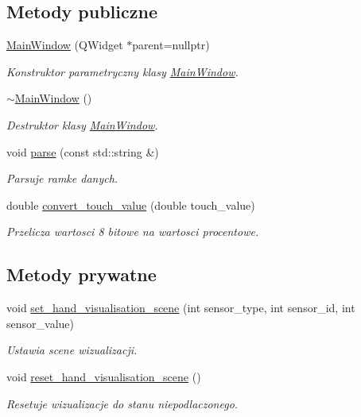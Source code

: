 \subsection*{Metody publiczne}
\begin{DoxyCompactItemize}
\item 
\hyperlink{class_main_window_a996c5a2b6f77944776856f08ec30858d}{Main\+Window} (Q\+Widget $\ast$parent=nullptr)
\begin{DoxyCompactList}\small\item\em Konstruktor parametryczny klasy \hyperlink{class_main_window}{Main\+Window}. \end{DoxyCompactList}\item 
\hyperlink{class_main_window_ae98d00a93bc118200eeef9f9bba1dba7}{$\sim$\+Main\+Window} ()
\begin{DoxyCompactList}\small\item\em Destruktor klasy \hyperlink{class_main_window}{Main\+Window}. \end{DoxyCompactList}\item 
void \hyperlink{class_main_window_abd0de3498ec3287461bbe2ce70791ede}{parse} (const std\+::string \&)
\begin{DoxyCompactList}\small\item\em Parsuje ramke danych. \end{DoxyCompactList}\item 
double \hyperlink{class_main_window_ac16a3b21d65b063b89b87e772afcfd0c}{convert\+\_\+touch\+\_\+value} (double touch\+\_\+value)
\begin{DoxyCompactList}\small\item\em Przelicza wartosci 8 bitowe na wartosci procentowe. \end{DoxyCompactList}\end{DoxyCompactItemize}
\subsection*{Metody prywatne}
\begin{DoxyCompactItemize}
\item 
void \hyperlink{class_main_window_a4d86826d446cf0ab604eb29d3e5e0473}{set\+\_\+hand\+\_\+visualisation\+\_\+scene} (int sensor\+\_\+type, int sensor\+\_\+id, int sensor\+\_\+value)
\begin{DoxyCompactList}\small\item\em Ustawia scene wizualizacji. \end{DoxyCompactList}\item 
void \hyperlink{class_main_window_ab0b70af5bbf9d5593219262c98fe1c71}{reset\+\_\+hand\+\_\+visualisation\+\_\+scene} ()
\begin{DoxyCompactList}\small\item\em Resetuje wizualizacje do stanu niepodlaczonego. \end{DoxyCompactList}\end{DoxyCompactItemize}
